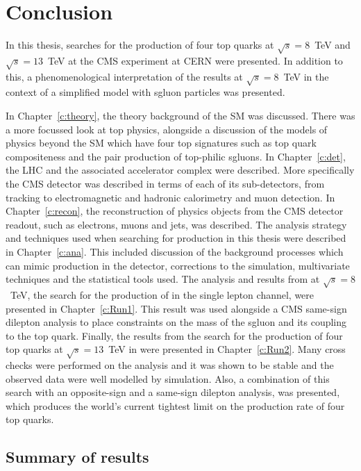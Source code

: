 \chapter{Conclusion}
\label{c:DandC}

In this thesis, searches for the production of four top quarks at $\sqrt{s}=8$~TeV and $\sqrt{s}=13$~TeV at the CMS experiment at CERN were presented. In addition to this, a phenomenological interpretation of the results at $\sqrt{s}=8$~TeV in the context of a simplified model with sgluon particles was presented.

In Chapter~\ref{c:theory}, the theory background of the SM was discussed. There was a more focussed look at top physics, alongside a discussion of the models of physics beyond the SM which have four top signatures such as top quark compositeness and the pair production of top-philic sgluons. 
In Chapter~\ref{c:det}, the LHC and the associated accelerator complex were described. More specifically the CMS detector was described in terms of each of its sub-detectors, from tracking to electromagnetic and hadronic calorimetry and muon detection.
In Chapter~\ref{c:recon}, the reconstruction of physics objects from the CMS detector readout, such as electrons, muons and jets, was described.
The analysis strategy and techniques used when searching for \tttt production in this thesis were described in Chapter~\ref{c:ana}. This included discussion of the background processes which can mimic \tttt production in the detector, corrections to the simulation, multivariate techniques and the statistical tools used.
The analysis and results from \runone at $\sqrt{s}=8$~TeV, the search for the production of \tttt in the single lepton channel, were presented in Chapter~\ref{c:Run1}. This result was used alongside a CMS same-sign dilepton analysis to place constraints on the mass of the sgluon and its coupling to the top quark.
Finally, the results from the search for the production of four top quarks at $\sqrt{s}=13$~TeV in \runtwo were presented in Chapter~\ref{c:Run2}. Many cross checks were performed on the analysis and it was shown to be stable and the observed data were well modelled by simulation. Also, a combination of this search with an opposite-sign and a same-sign dilepton analysis, was presented, which produces the world's current tightest limit on the production rate of four top quarks.

\section{Summary of results}

